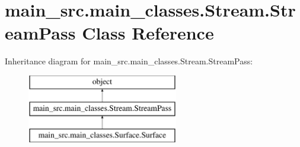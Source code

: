 \hypertarget{classmain__src_1_1main__classes_1_1Stream_1_1StreamPass}{\section{main\-\_\-src.\-main\-\_\-classes.\-Stream.\-Stream\-Pass Class Reference}
\label{classmain__src_1_1main__classes_1_1Stream_1_1StreamPass}
}
Inheritance diagram for main\-\_\-src.\-main\-\_\-classes.\-Stream.\-Stream\-Pass\-:\begin{figure}[H]
\begin{center}
\leavevmode
\includegraphics[height=3.000000cm]{classmain__src_1_1main__classes_1_1Stream_1_1StreamPass}
\end{center}
\end{figure}
